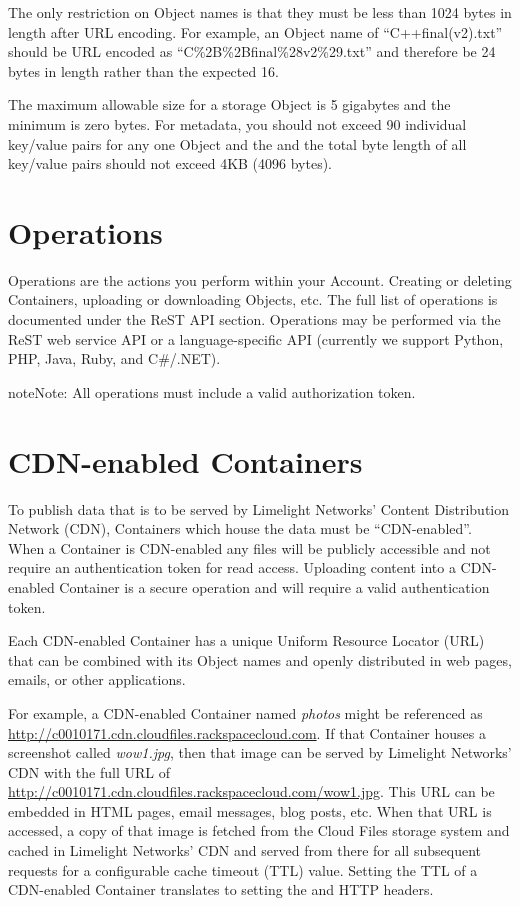 \documentclass[letterpaper,10pt,english]{manual}
\begin{document}
The only restriction on Object names is that they must be less than 1024
bytes in length after URL encoding.  For example, an Object name of
“C++final(v2).txt” should be URL encoded as “C\%2B\%2Bfinal\%28v2\%29.txt”
and therefore be 24 bytes in length rather than the expected 16.

The maximum allowable size for a storage Object is 5 gigabytes and the
minimum is zero bytes.  For metadata, you should not exceed 90 individual
key/value pairs for any one Object and the and the total byte length of
all key/value pairs should not exceed 4KB (4096 bytes).


\section{Operations}

Operations are the actions you perform within your Account. Creating or
deleting Containers, uploading or downloading Objects, etc. The full list
of operations is documented under the ReST API section. Operations may be
performed via the ReST web service API or a language-specific API
(currently we support Python, PHP, Java, Ruby, and C\#/.NET).

\begin{notice}{note}{Note:}
All operations must include a valid authorization token.
\end{notice}


\section{CDN-enabled Containers}

To publish data that is to be served by Limelight Networks' Content
Distribution Network (CDN), Containers which house the data must be
“CDN-enabled”.  When a Container is CDN-enabled any files will be
publicly accessible and not require an authentication token for read
access.  Uploading content into a CDN-enabled Container is a secure
operation and will require a valid authentication token.

Each CDN-enabled Container has a unique Uniform Resource Locator (URL)
that can be combined with its Object names and openly distributed in web
pages, emails, or other applications.

For example, a CDN-enabled Container named \emph{photos} might be referenced as
\href{http://c0010171.cdn.cloudfiles.rackspacecloud.com}{http://c0010171.cdn.cloudfiles.rackspacecloud.com}.  If that Container
houses a screenshot called \emph{wow1.jpg}, then that image can be served by
Limelight Networks' CDN with the full URL of
\href{http://c0010171.cdn.cloudfiles.rackspacecloud.com/wow1.jpg}{http://c0010171.cdn.cloudfiles.rackspacecloud.com/wow1.jpg}.  This URL can
be embedded in HTML pages, email messages, blog posts, etc.  When that URL
is accessed, a copy of that image is fetched from the Cloud Files storage
system and cached in Limelight Networks' CDN and served from there for
all subsequent requests for a configurable cache timeout (TTL) value.
Setting the TTL of a CDN-enabled Container translates to setting the
 and  HTTP headers.
\end{document}
